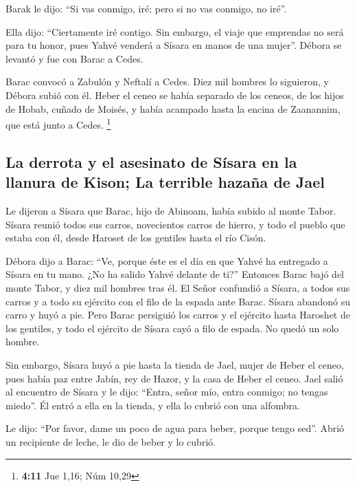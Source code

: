  Barak le dijo: ``Si vas conmigo, iré; pero si no vas
conmigo, no iré''.

 Ella dijo: ``Ciertamente iré contigo. Sin embargo, el
viaje que emprendas no será para tu honor, pues Yahvé venderá a Sísara
en manos de una mujer''. Débora se levantó y fue con Barac a Cedes.

 Barac convocó a Zabulón y Neftalí a Cedes. Diez mil
hombres lo siguieron, y Débora subió con él.  Heber el
ceneo se había separado de los ceneos, de los hijos de Hobab, cuñado de
Moisés, y había acampado hasta la encina de Zaanannim, que está junto a
Cedes. \footnote{\textbf{4:11} Jue 1,16; Núm 10,29}

\hypertarget{la-derrota-y-el-asesinato-de-suxedsara-en-la-llanura-de-kison-la-terrible-hazauxf1a-de-jael}{%
\subsection{La derrota y el asesinato de Sísara en la llanura de Kison;
La terrible hazaña de
Jael}\label{la-derrota-y-el-asesinato-de-suxedsara-en-la-llanura-de-kison-la-terrible-hazauxf1a-de-jael}}

 Le dijeron a Sísara que Barac, hijo de Abinoam, había
subido al monte Tabor.  Sísara reunió todos sus carros,
novecientos carros de hierro, y todo el pueblo que estaba con él, desde
Haroset de los gentiles hasta el río Cisón.

 Débora dijo a Barac: ``Ve, porque éste es el día en que
Yahvé ha entregado a Sísara en tu mano. ¿No ha salido Yahvé delante de
ti?'' Entonces Barac bajó del monte Tabor, y diez mil hombres tras él.
 El Señor confundió a Sísara, a todos sus carros y a todo
su ejército con el filo de la espada ante Barac. Sísara abandonó su
carro y huyó a pie.  Pero Barac persiguió los carros y el
ejército hasta Haroshet de los gentiles, y todo el ejército de Sísara
cayó a filo de espada. No quedó un solo hombre.

 Sin embargo, Sísara huyó a pie hasta la tienda de Jael,
mujer de Heber el ceneo, pues había paz entre Jabín, rey de Hazor, y la
casa de Heber el ceneo.  Jael salió al encuentro de
Sísara y le dijo: ``Entra, señor mío, entra conmigo; no tengas miedo''.
Él entró a ella en la tienda, y ella lo cubrió con una alfombra.

 Le dijo: ``Por favor, dame un poco de agua para beber,
porque tengo sed''. Abrió un recipiente de leche, le dio de beber y lo
cubrió.

